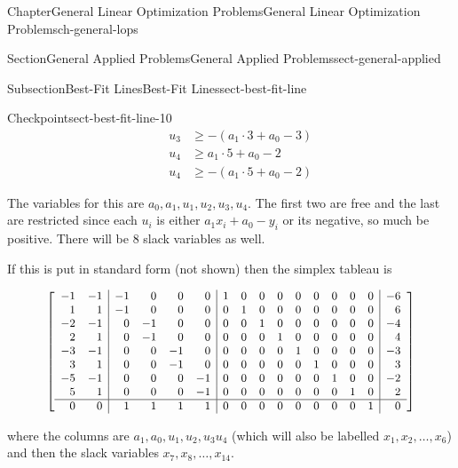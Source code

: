 \documentclass[oneside,10pt,]{book}
\numberwithin{equation}{section}
\newcommand{\amp}{&}
\begin{document}
\begin{chapterptx}{Chapter}{General Linear Optimization Problems}{}{General Linear Optimization Problems}{}{}{ch-general-lops}
\begin{sectionptx}{Section}{General Applied Problems}{}{General Applied Problems}{}{}{sect-general-applied}
\begin{subsectionptx}{Subsection}{Best-Fit Lines}{}{Best-Fit Lines}{}{}{sect-best-fit-line}
\begin{inlineexercise}{Checkpoint}{}{sect-best-fit-line-10}
\begin{equation*}
\begin{aligned}
\amp \amp u_3 \amp \geq -(a_1 \cdot 3 + a_0 -3) \\
\amp \amp u_4 \amp \geq a_1 \cdot 5 + a_0 -2 \\
\amp \amp u_4 \amp \geq -(a_1 \cdot 5 + a_0 -2)
\end{aligned}
\end{equation*}
%
\par
The variables for this are \(a_0, a_1, u_1, u_2, u_3, u_4\).  The first two are free and the last are restricted since each \(u_i\) is either \(a_1 x_i + a_0 - y_i\) or its negative, so much be positive.  There will be 8 slack variables as well.%
\par
If this is put in standard form (not shown) then the simplex tableau is%
\par
%
\begin{equation*}
{\small
\left[\begin{array}{rr|rrrr|rrrrrrrrr|r}
-1 \amp -1 \amp -1 \amp 0 \amp 0 \amp 0 \amp 1 \amp 0 \amp 0 \amp 0 \amp 0 \amp 0 \amp 0 \amp 0 \amp 0 \amp -6\\
1 \amp 1 \amp -1 \amp 0 \amp 0 \amp 0 \amp 0 \amp 1 \amp 0 \amp 0 \amp 0 \amp 0 \amp 0 \amp 0 \amp 0 \amp 6\\
-2 \amp -1 \amp 0 \amp -1 \amp 0 \amp 0 \amp 0 \amp 0 \amp 1 \amp 0 \amp 0 \amp 0 \amp 0 \amp 0 \amp 0 \amp -4\\
2 \amp 1 \amp 0 \amp -1 \amp 0 \amp 0 \amp 0 \amp 0 \amp 0 \amp 1 \amp 0 \amp 0 \amp 0 \amp 0 \amp 0 \amp 4\\
-3 \amp -1 \amp 0 \amp 0 \amp -1 \amp 0 \amp 0 \amp 0 \amp 0 \amp 0 \amp 1 \amp 0 \amp 0 \amp 0 \amp 0 \amp -3\\
3 \amp 1 \amp 0 \amp 0 \amp -1 \amp 0 \amp 0 \amp 0 \amp 0 \amp 0 \amp 0 \amp 1 \amp 0 \amp 0 \amp 0 \amp 3\\
-5 \amp -1 \amp 0 \amp 0 \amp 0 \amp -1 \amp 0 \amp 0 \amp 0 \amp 0 \amp 0 \amp 0 \amp 1 \amp 0 \amp 0 \amp -2\\
5 \amp 1 \amp 0 \amp 0 \amp 0 \amp -1 \amp 0 \amp 0 \amp 0 \amp 0 \amp 0 \amp 0 \amp 0 \amp 1 \amp 0 \amp 2\\ \hline
0 \amp 0 \amp 1 \amp 1 \amp 1 \amp 1 \amp 0 \amp 0 \amp 0 \amp 0 \amp 0 \amp 0 \amp 0 \amp 0 \amp 1 \amp 0\\
\end{array} \right]
}
\end{equation*}
%
\par
where the columns are \(a_1, a_0, u_1, u_2, u_3 u_4\) (which will also be labelled \(x_1, x_2, \ldots, x_6\)) and then the slack variables \(x_7, x_8, \ldots, x_{14}\).%

\end{inlineexercise}
\end{subsectionptx}
\end{sectionptx}
\end{chapterptx}
\end{document}
